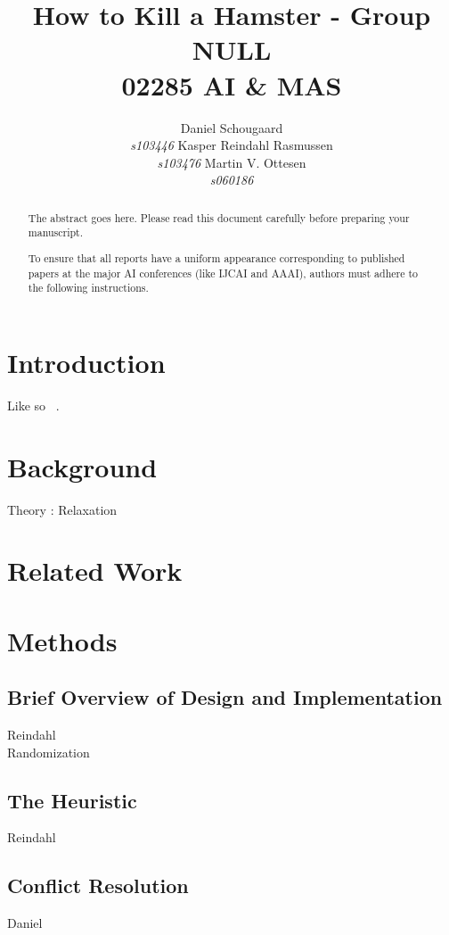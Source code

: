 \documentclass[letterpaper]{article}
\begin{document}
\title{How to Kill a Hamster - Group NULL\\ 02285 AI \& MAS}
\author{Daniel Schougaard \\ \textit{s103446} \And Kasper Reindahl Rasmussen\\ \textit{s103476} \And Martin V. Ottesen\\ \textit{s060186}}
\maketitle

\begin{abstract}
The abstract goes here. Please read this document carefully before preparing your manuscript.

To ensure that all reports have a uniform appearance corresponding to published papers at the major AI conferences (like IJCAI and AAAI), authors must adhere to the following instructions. 
\end{abstract}

\section{Introduction}
	Like so ~\cite{book2015}. 
\section{Background}
	Theory : Relaxation

\section{Related Work}

\section{Methods}
	\subsection{Brief Overview of Design and Implementation}
		Reindahl\\
		Randomization
	\subsection{The Heuristic}
		Reindahl \\
	\subsection{Conflict Resolution}
		Daniel
\end{document}
